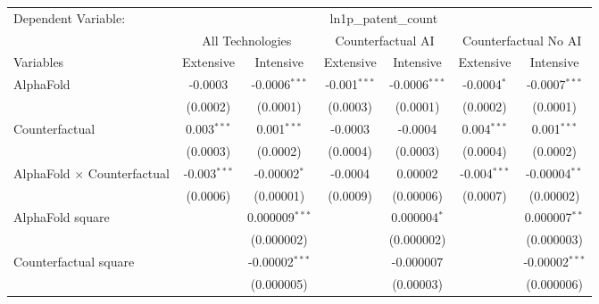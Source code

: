 \begingroup
\centering
\begin{tabular}{lcccccc}
   \tabularnewline \midrule \midrule
   Dependent Variable: & \multicolumn{6}{c}{ln1p\_patent\_count}\\
 & \multicolumn{2}{c}{All Technologies} & \multicolumn{2}{c}{Counterfactual AI} & \multicolumn{2}{c}{Counterfactual No AI} \\
\cmidrule(lr){1-1}\cmidrule(lr){2-3} \cmidrule(lr){4-5} \cmidrule(lr){6-7}
Variables & \multicolumn{1}{c}{Extensive} & \multicolumn{1}{c}{Intensive} & \multicolumn{1}{c}{Extensive} & \multicolumn{1}{c}{Intensive} & \multicolumn{1}{c}{Extensive} & \multicolumn{1}{c}{Intensive} \\
\cmidrule(lr){1-1}\cmidrule(lr){2-2} \cmidrule(lr){3-3} \cmidrule(lr){4-4} \cmidrule(lr){5-5} \cmidrule(lr){6-6} \cmidrule(lr){7-7}
   AlphaFold                          & -0.0003        & -0.0006$^{***}$   & -0.001$^{***}$ & -0.0006$^{***}$ & -0.0004$^{*}$  & -0.0007$^{***}$\\   
                                      & (0.0002)       & (0.0001)          & (0.0003)       & (0.0001)        & (0.0002)       & (0.0001)\\   
   Counterfactual                     & 0.003$^{***}$  & 0.001$^{***}$     & -0.0003        & -0.0004         & 0.004$^{***}$  & 0.001$^{***}$\\   
                                      & (0.0003)       & (0.0002)          & (0.0004)       & (0.0003)        & (0.0004)       & (0.0002)\\   
   AlphaFold $\times$ Counterfactual  & -0.003$^{***}$ & -0.00002$^{*}$    & -0.0004        & 0.00002         & -0.004$^{***}$ & -0.00004$^{**}$\\   
                                      & (0.0006)       & (0.00001)         & (0.0009)       & (0.00006)       & (0.0007)       & (0.00002)\\   
   AlphaFold square                   &                & 0.000009$^{***}$  &                & 0.000004$^{*}$  &                & 0.000007$^{**}$\\   
                                      &                & (0.000002)        &                & (0.000002)      &                & (0.000003)\\   
   Counterfactual square              &                & -0.00002$^{***}$  &                & -0.000007       &                & -0.00002$^{***}$\\   
                                      &                & (0.000005)        &                & (0.00003)       &                & (0.000006)\\   

\end{tabular}
